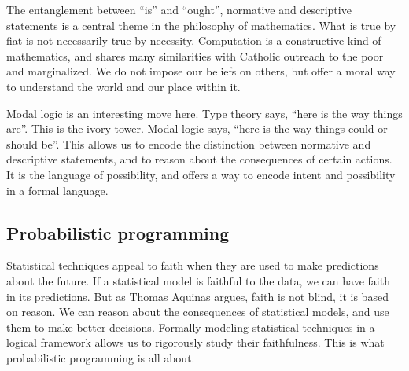 \documentclass[sigplan,nonacm]{acmart}\settopmatter{printfolios=false,printccs=false,printacmref=false}
\begin{document}
  The entanglement between ``is'' and ``ought'', normative and descriptive statements is a central theme in the philosophy of mathematics. What is true by fiat is not necessarily true by necessity. Computation is a constructive kind of mathematics, and shares many similarities with Catholic outreach to the poor and marginalized. We do not impose our beliefs on others, but offer a moral way to understand the world and our place within it.

  Modal logic is an interesting move here. Type theory says, ``here is the way things are''. This is the ivory tower. Modal logic says, ``here is the way things could or should be''. This allows us to encode the distinction between normative and descriptive statements, and to reason about the consequences of certain actions. It is the language of possibility, and offers a way to encode intent and possibility in a formal language.

  \subsection{Probabilistic programming}

  Statistical techniques appeal to faith when they are used to make predictions about the future. If a statistical model is faithful to the data, we can have faith in its predictions. But as Thomas Aquinas argues, faith is not blind, it is based on reason. We can reason about the consequences of statistical models, and use them to make better decisions. Formally modeling statistical techniques in a logical framework allows us to rigorously study their faithfulness. This is what probabilistic programming is all about.

  
\end{document}
